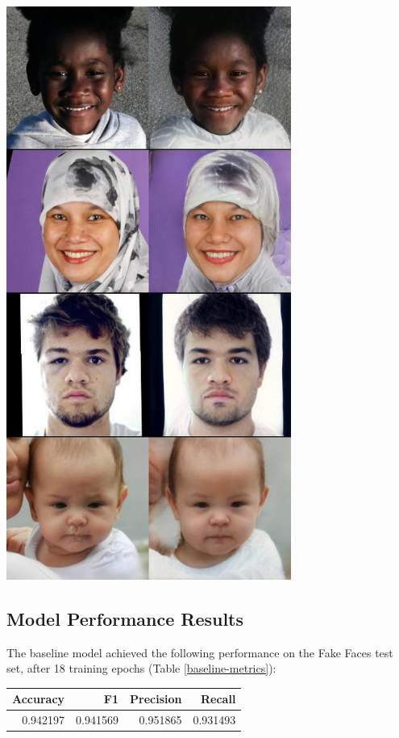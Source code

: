 \documentclass[11pt, letterpaper]{article}
\newenvironment{Figure}
  {\par\medskip\noindent\minipage{\linewidth}}
  {\endminipage\par\medskip}
\begin{document}
\begin{multicols}{2}
  \begin{Figure}
    \centering
    \includegraphics[width=0.7\textwidth]{figures/fair2fake.jpg}
    \label{fair2fake}
  \end{Figure}

  \subsection{Model Performance Results}

  The baseline model achieved the following performance on the Fake Faces test
  set, after 18 training epochs (Table \ref{baseline-metrics}):

  \begin{Figure}
    \label{baseline-metrics}
    \begin{tabular}{rrrr}
    \toprule
     Accuracy &        F1 &  Precision &    Recall \\
    \midrule
     0.942197 &  0.941569 &   0.951865 &  0.931493 \\
    \bottomrule
    \end{tabular}
  \end{Figure}


\end{multicols}
\end{document}
